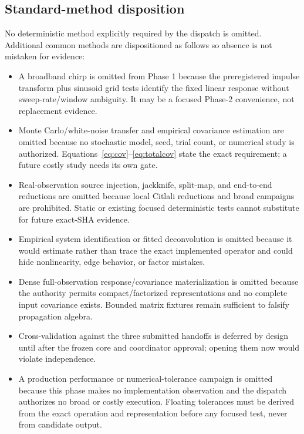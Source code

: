 \documentclass[11pt]{article}
\begin{document}
\subsection{Standard-method disposition}

No deterministic method explicitly required by the dispatch is omitted.
Additional common methods are dispositioned as follows so absence is not
mistaken for evidence:

\begin{itemize}
\item A broadband chirp is omitted from Phase 1 because the preregistered
      impulse transform plus sinusoid grid tests identify the fixed linear
      response without sweep-rate/window ambiguity.  It may be a focused
      Phase-2 convenience, not replacement evidence.
\item Monte Carlo/white-noise transfer and empirical covariance estimation are
      omitted because no stochastic model, seed, trial count, or numerical
      study is authorized.  Equations~\eqref{eq:cov}--\eqref{eq:totalcov}
      state the exact requirement; a future costly study needs its own gate.
\item Real-observation source injection, jackknife, split-map, and end-to-end
      reductions are omitted because local Citlali reductions and broad
      campaigns are prohibited.  Static or existing focused deterministic
      tests cannot substitute for future exact-SHA evidence.
\item Empirical system identification or fitted deconvolution is omitted
      because it would estimate rather than trace the exact implemented
      operator and could hide nonlinearity, edge behavior, or factor mistakes.
\item Dense full-observation response/covariance materialization is omitted
      because the authority permits compact/factorized representations and no
      complete input covariance exists.  Bounded matrix fixtures remain
      sufficient to falsify propagation algebra.
\item Cross-validation against the three submitted handoffs is deferred by
      design until after the frozen core and coordinator approval; opening
      them now would violate independence.
\item A production performance or numerical-tolerance campaign is omitted
      because this phase makes no implementation observation and the dispatch
      authorizes no broad or costly execution.  Floating tolerances must be
      derived from the exact operation and representation before any focused
      test, never from candidate output.
\end{itemize}
\end{document}
